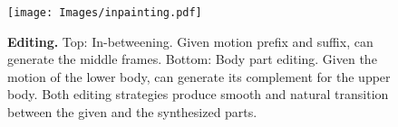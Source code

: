 \begin{figure}
    

    \centering
    
    \texttt{[image: Images/inpainting.pdf]}
    
    \caption{
        \textbf{Editing.} Top: In-betweening. Given motion prefix and suffix, \algoname can generate the middle frames. Bottom: Body part editing. Given the motion of the lower body, \algoname can generate its complement for the upper body.
        Both editing strategies produce smooth and natural transition between the given and the synthesized parts.
    }
    \label{fig:inpainting}
    \Description[]{}  %
\end{figure}
